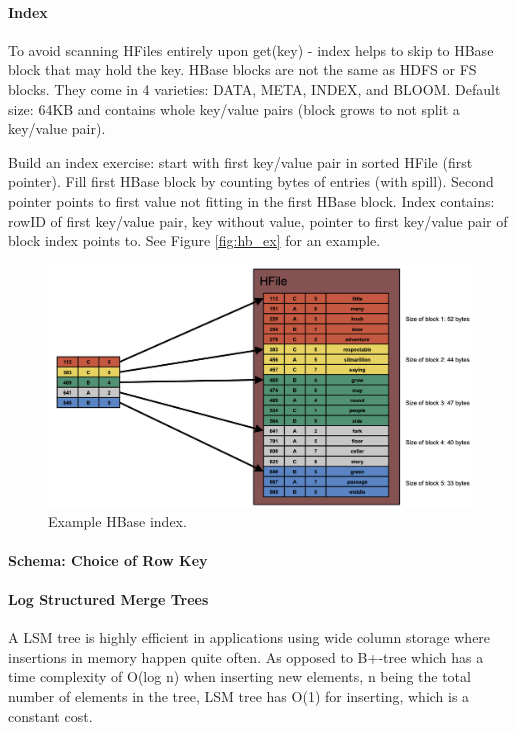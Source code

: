 \paragraph{Index}
To avoid scanning HFiles entirely upon get(key) - index helps to skip to HBase block that may hold the key. HBase blocks are not the same as HDFS or FS blocks. They come in 4 varieties: DATA, META, INDEX, and BLOOM. Default size: 64KB and contains whole key/value pairs (block grows to not split a key/value pair).

Build an index exercise: start with first key/value pair in sorted HFile (first pointer). Fill first HBase block by counting bytes of entries (with spill). Second pointer points to first value not fitting in the first HBase block. Index contains: rowID of first key/value pair, key without value, pointer to first key/value pair of block index points to. See Figure \ref{fig:hb_ex} for an example.

\begin{figure}[h]
	\centering
	\includegraphics[scale=0.5]{images/6-hb_index.png}
	\caption{Example HBase index.}
	\label{fig:hb_index}
\end{figure}

\paragraph{Schema: Choice of Row Key}

\paragraph{Log Structured Merge Trees}
A LSM tree is highly efficient in applications using wide column storage where insertions in memory happen quite often. As opposed to B+-tree which has a time complexity of O(log n) when inserting new elements, n being the total number of elements in the tree, LSM tree has O(1) for inserting, which is a constant cost.

